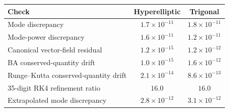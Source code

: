 \begin{center}
\begin{tabular}{lcc}
\hline
Check & Hyperelliptic & Trigonal\\
\hline
Mode discrepancy & $1.7\times10^{-11}$ & $1.8\times10^{-11}$\\
Mode-power discrepancy & $1.6\times10^{-11}$ & $1.2\times10^{-11}$\\
Canonical vector-field residual & $1.2\times10^{-15}$ & $1.2\times10^{-12}$\\
BA conserved-quantity drift & $1.0\times10^{-15}$ & $1.6\times10^{-12}$\\
Runge--Kutta conserved-quantity drift & $2.1\times10^{-14}$ & $8.6\times10^{-13}$\\
35-digit RK4 refinement ratio & $16.0$ & $16.0$\\
Extrapolated mode discrepancy & $2.8\times10^{-12}$ & $3.1\times10^{-12}$\\
\hline
\end{tabular}
\end{center}
